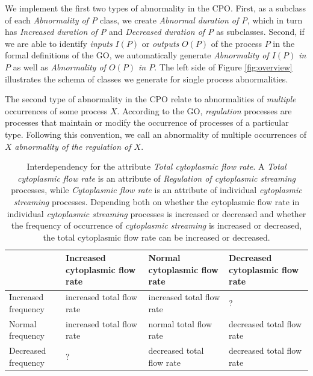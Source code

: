 \documentclass{bioinfo}
\begin{document}
We implement the first two types of abnormality in the CPO. First, as
a subclass of each {\em Abnormality of P} class, we create {\em
  Abnormal duration of P}, which in turn has {\em Increased duration
  of P} and {\em Decreased duration of P} as subclasses. Second, if we
are able to identify {\em inputs} $I(P)$ or {\em outputs} $O(P)$ of
the process $P$ in the formal definitions of the GO, we automatically
generate {\em Abnormality of $I(P)$ in $P$} as well as {\em
  Abnormality of $O(P)$ in $P$}.  The left side of Figure
\ref{fig:overview} illustrates the schema of classes we generate for
single process abnormalities.

The second type of abnormality in the CPO relate to abnormalities of
{\em multiple} occurrences of some process $X$. According to the GO,
{\em regulation} processes are processes that maintain or modify the
occurrence of processes of a particular type. Following this
convention, we call an abnormality of multiple occurrences of $X$ {\em
  abnormality of the regulation of $X$}.

\begin{table}
  \centering
  \begin{tabular}{l|l|l|l}
    & Increased cytoplasmic flow rate & Normal cytoplasmic flow rate & Decreased
    cytoplasmic flow rate \\
    \hline
    Increased frequency &increased total flow rate &increased total
    flow rate &?\\
    Normal frequency &increased total flow rate &normal total flow
    rate &decreased total flow rate\\
    Decreased frequency &?&decreased total flow rate &decreased total
    flow rate\\
    \hline
  \end{tabular}
  \caption{\label{tbl:flow}Interdependency for the attribute {\em
      Total cytoplasmic flow rate}. A {\em Total cytoplasmic flow
      rate} is an attribute of {\em Regulation of cytoplasmic
      streaming} processes, while {\em Cytoplasmic flow rate} is an
    attribute of individual {\em cytoplasmic streaming}
    processes. Depending both on whether the cytoplasmic flow rate in
    individual {\em cytoplasmic streaming} processes is increased or
    decreased and whether the frequency of occurrence of {\em
      cytoplasmic streaming} is increased or decreased, the total
    cytoplasmic flow rate can be increased or decreased.}
\end{table}
\end{document}
